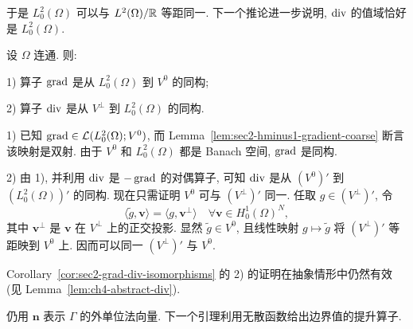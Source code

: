 于是 $L_0^2(\Omega)$ 可以与 $L^2(\Omega)/\mathbb{R}$ 等距同一. 下一个推论进一步说明,
$\operatorname{div}$ 的值域恰好是 $L_0^2(\Omega)$.

\setcounter{statement}{3}
\begin{Corollary}\label{cor:sec2-grad-div-isomorphisms}
设 $\Omega$ 连通. 则:

1) 算子 $\operatorname{grad}$ 是从 $L_0^2(\Omega)$ 到 $V^0$ 的同构;

2) 算子 $\operatorname{div}$ 是从 $V^\perp$ 到 $L_0^2(\Omega)$ 的同构.
\end{Corollary}
\begin{Proof}
1) 已知 $\operatorname{grad}\in\mathcal{L}(L_0^2(\Omega);V^0)$, 而
Lemma~\ref{lem:sec2-hminus1-gradient-coarse} 断言该映射是双射.
由于 $V^0$ 和 $L_0^2(\Omega)$ 都是 Banach 空间, $\operatorname{grad}$ 是同构.

2) 由 1), 并利用 $\operatorname{div}$ 是 $-\operatorname{grad}$ 的对偶算子, 可知 $\operatorname{div}$ 是从
$(V^0)'$ 到 $(L_0^2(\Omega))'$ 的同构. 现在只需证明 $V^0$ 可与
$(V^\perp)'$ 同一. 任取 $g\in(V^\perp)'$, 令
\[
  \langle\widetilde g,\mathbf v\rangle=\langle g,\mathbf v^\perp\rangle
  \quad\forall\mathbf v\in H_0^1(\Omega)^N,
\]
其中 $\mathbf v^\perp$ 是 $\mathbf v$ 在 $V^\perp$ 上的正交投影. 显然
$\widetilde g\in V^0$, 且线性映射 $g\mapsto\widetilde g$ 将
$(V^\perp)'$ 等距映到 $V^0$ 上. 因而可以同一 $(V^\perp)'$ 与 $V^0$.
\end{Proof}

\setcounter{statement}{0}
\begin{Remark}\label{rem:sec2-abstract-div-isomorphism}
Corollary~\ref{cor:sec2-grad-div-isomorphisms} 的 2) 的证明在抽象情形中仍然有效
(见 Lemma~\ref{lem:ch4-abstract-div}).
\end{Remark}

仍用 $\mathbf n$ 表示 $\Gamma$ 的外单位法向量. 下一个引理利用无散函数给出边界值的提升算子.

